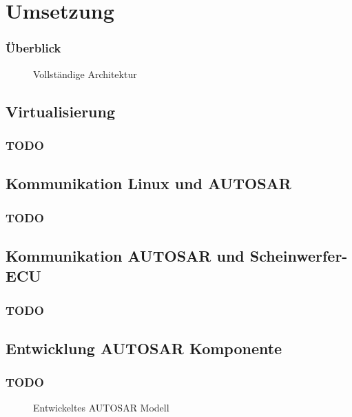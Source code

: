 \documentclass[draft]{beamer}
\newcommand{\inputImage}[1]{}
\begin{document}
\section{Umsetzung}
\label{sec:umsetzung}

\begin{frame}
\frametitle{Überblick}
    \begin{figure}[ht]
        \centering
        \inputImage{arch_finished.dia}
        \caption{Vollständige Architektur}
        \label{fig:arch_finished}
    \end{figure}
\end{frame}




\subsection{Virtualisierung}
\begin{frame}
\frametitle{TODO}

\end{frame}




\subsection{Kommunikation Linux und AUTOSAR}
\begin{frame}
\frametitle{TODO}

\end{frame}




\subsection{Kommunikation AUTOSAR und Scheinwerfer-ECU}
\begin{frame}
\frametitle{TODO}

\end{frame}




\subsection{Entwicklung AUTOSAR Komponente}
\begin{frame}
\frametitle{TODO}
    \begin{figure}[ht]
        \centering
        \resizebox{\linewidth}{!}{\inputImage{SMLS_Modell.dia}}
        \caption{Entwickeltes AUTOSAR Modell}
        \label{fig:smls_modell}
    \end{figure}
\end{frame}
\end{document}
